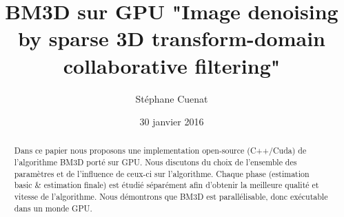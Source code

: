\documentclass[12pt,a4paper]{memoir} %
\begin{document}
\begin{titlingpage}
\title{BM3D sur GPU "Image denoising by sparse 3D transform-domain collaborative filtering"}
\author{\small{Stéphane Cuenat}}
\date{\small{30 janvier 2016}}
\maketitle

\begin{abstract}
Dans ce papier nous proposons une implementation open-source (C++/Cuda) de l'algorithme BM3D porté sur GPU. Nous discutons du choix de l'ensemble des paramètres et de l'influence de ceux-ci sur l'algorithme. Chaque phase (estimation basic \& estimation finale) est étudié séparément afin d'obtenir la meilleure qualité et vitesse de l'algorithme. Nous démontrons que BM3D est parallélisable, donc exécutable dans un monde GPU.   
\end{abstract}
\end{titlingpage}

\tableofcontents







\begin{appendix}
  \listoffigures
\end{appendix}



\end{document}
